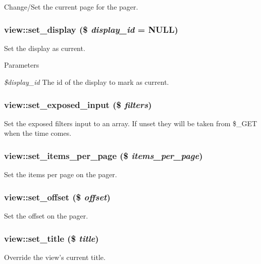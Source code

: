 \label{classview_a421f000fc97fb8f7dda965cbdd285071}
Change/Set the current page for the pager. \hypertarget{classview_aafb326696e2de96d2012882b5275c54c}{
\subsubsection[{set\_\-display}]{\setlength{\rightskip}{0pt plus 5cm}view::set\_\-display (\$ {\em display\_\-id} = {\ttfamily NULL})}}
\label{classview_aafb326696e2de96d2012882b5275c54c}
Set the display as current.


\begin{DoxyParams}{Parameters}
\item[{\em \$display\_\-id}]The id of the display to mark as current. \end{DoxyParams}
\hypertarget{classview_abe2340e413d0ef7a6dfeba37f09fc88c}{
\subsubsection[{set\_\-exposed\_\-input}]{\setlength{\rightskip}{0pt plus 5cm}view::set\_\-exposed\_\-input (\$ {\em filters})}}
\label{classview_abe2340e413d0ef7a6dfeba37f09fc88c}
Set the exposed filters input to an array. If unset they will be taken from \$\_\-GET when the time comes. \hypertarget{classview_ad1f69acfdb3771ec2d6f54fdb7ed7e4c}{
\subsubsection[{set\_\-items\_\-per\_\-page}]{\setlength{\rightskip}{0pt plus 5cm}view::set\_\-items\_\-per\_\-page (\$ {\em items\_\-per\_\-page})}}
\label{classview_ad1f69acfdb3771ec2d6f54fdb7ed7e4c}
Set the items per page on the pager. \hypertarget{classview_ae8156db948b1c7efaeeebd72148147f5}{
\subsubsection[{set\_\-offset}]{\setlength{\rightskip}{0pt plus 5cm}view::set\_\-offset (\$ {\em offset})}}
\label{classview_ae8156db948b1c7efaeeebd72148147f5}
Set the offset on the pager. \hypertarget{classview_aa849a1cc4b59a1cbd89ecd300d114d6d}{
\subsubsection[{set\_\-title}]{\setlength{\rightskip}{0pt plus 5cm}view::set\_\-title (\$ {\em title})}}
\label{classview_aa849a1cc4b59a1cbd89ecd300d114d6d}
Override the view's current title.

